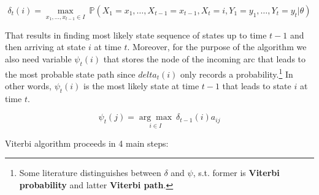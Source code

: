 \begin{equation}
    \delta_t(i) = \underset{x_1,\ldots,x_{t-1} \in I}{\max}\: \mathbb{P}(X_1=x_1,\ldots,X_{t-1}=x_{t-1},X_t=i,Y_1 = y_1,\ldots,Y_{t}=y_t|\theta)
\end{equation}

That results in finding most likely state sequence of states up to time $t-1$ and then arriving at state $i$ at time $t$. Moreover, for the purpose of the algorithm we also need variable $\psi_t(i)$ 
that stores the node of the incoming arc that leads to the most probable state path since $delta_t(i)$ only records a probability.\footnote{Some literature distinguishes between $\delta$ and $\psi$, s.t. former is \textbf{Viterbi probability} and latter \textbf{Viterbi path}.} 
In other words, $\psi_t(i)$ is the most likely state at time $t-1$ that leads to state $i$ at time $t$.

\begin{equation}
\psi_t(j) = \underset{i \in I}{\arg\max} \: \delta_{t-1}(i)a_{ij}
\end{equation}

\noindent Viterbi algorithm proceeds in 4 main steps:

